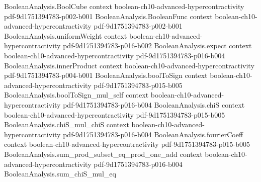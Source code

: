 \begin{theorem}
\leanok
{}
\label{BooleanAnalysis.Hypercontractivity.general_two_function_hypercontractivity}
\proofstep
  {BooleanAnalysis.BoolCube}
  {context}
  {boolean-ch10-advanced-hypercontractivity}
  {pdf-9d1751394783-p002-b001}
\proofstep
  {BooleanAnalysis.BooleanFunc}
  {context}
  {boolean-ch10-advanced-hypercontractivity}
  {pdf-9d1751394783-p002-b001}
\proofstep
  {BooleanAnalysis.uniformWeight}
  {context}
  {boolean-ch10-advanced-hypercontractivity}
  {pdf-9d1751394783-p016-b002}
\proofstep
  {BooleanAnalysis.expect}
  {context}
  {boolean-ch10-advanced-hypercontractivity}
  {pdf-9d1751394783-p016-b004}
\proofstep
  {BooleanAnalysis.innerProduct}
  {context}
  {boolean-ch10-advanced-hypercontractivity}
  {pdf-9d1751394783-p004-b001}
\proofstep
  {BooleanAnalysis.boolToSign}
  {context}
  {boolean-ch10-advanced-hypercontractivity}
  {pdf-9d1751394783-p015-b005}
\proofstep
  {BooleanAnalysis.boolToSign_mul_self}
  {context}
  {boolean-ch10-advanced-hypercontractivity}
  {pdf-9d1751394783-p016-b004}
\proofstep
  {BooleanAnalysis.chiS}
  {context}
  {boolean-ch10-advanced-hypercontractivity}
  {pdf-9d1751394783-p015-b005}
\proofstep
  {BooleanAnalysis.chiS_mul_chiS}
  {context}
  {boolean-ch10-advanced-hypercontractivity}
  {pdf-9d1751394783-p016-b004}
\proofstep
  {BooleanAnalysis.fourierCoeff}
  {context}
  {boolean-ch10-advanced-hypercontractivity}
  {pdf-9d1751394783-p015-b005}
\proofstep
  {BooleanAnalysis.sum_prod_subset_eq_prod_one_add}
  {context}
  {boolean-ch10-advanced-hypercontractivity}
  {pdf-9d1751394783-p016-b004}
\proofstep
  {BooleanAnalysis.sum_chiS_mul_eq}

\end{theorem}
